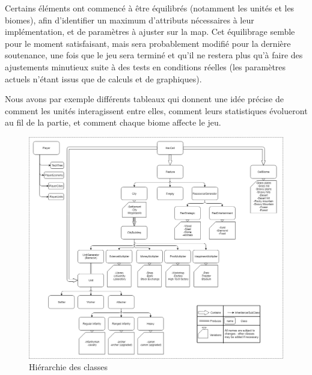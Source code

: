 \documentclass[12pt]{report}
\begin{document}
Certains éléments ont commencé à être équilibrés (notamment les unités et les biomes), afin d’identifier un maximum d’attributs nécessaires à leur implémentation, et de paramètres à ajuster sur la map. Cet équilibrage semble pour le moment satisfaisant, mais sera probablement modifié pour la dernière soutenance, une fois que le jeu sera terminé et qu’il ne restera plus qu’à faire des ajustements minutieux suite à des tests en conditions réelles (les paramètres actuels n’étant issus que de calculs et de graphiques).

Nous avons par exemple différents tableaux qui donnent une idée précise de comment les unités interagissent entre elles, comment leurs statistiques évolueront au fil de la partie, et comment chaque biome affecte le jeu.

\begin{figure}[H]
    \centering
    \includegraphics[width=1\textwidth]{class_hierarchy}
    \caption{Hiérarchie des classes}
\end{figure}
\end{document}
